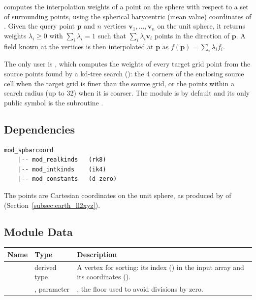  computes the interpolation weights of a point on the
sphere with respect to a set of surrounding points, using the spherical
barycentric (mean value) coordinates of \citet{langer2006}. Given the query
point $\mathbf{p}$ and $n$ vertices $\mathbf{v}_1, \ldots, \mathbf{v}_n$ on
the unit sphere, it returns weights $\lambda_i \ge 0$ with
$\sum_i \lambda_i = 1$ such that $\sum_i \lambda_i \mathbf{v}_i$ points in the
direction of $\mathbf{p}$. A field known at the vertices is then
interpolated at $\mathbf{p}$ as $f(\mathbf{p}) = \sum_i \lambda_i f_i$.

The only user is , which computes the weights of every
target grid point from the source points found by a kd-tree search
(): the 4 corners of the enclosing source cell
when the target grid is finer than the source grid, or the points within
a search radius (up to 32) when it is coarser. The module is  by default and its
only public symbol is the subroutine .

\subsection{Dependencies}

\begin{lstlisting}
mod_spbarcoord
    |-- mod_realkinds   (rk8)
    |-- mod_intkinds    (ik4)
    |-- mod_constants   (d_zero)
\end{lstlisting}

The points are Cartesian coordinates on the unit sphere, as produced by
 of  (Section~\ref{subsec:earth_ll2xyz}).

\subsection{Module Data}

\begin{longtable}{L{3.5cm} L{3.5cm} L{7cm}}
  \toprule
  \textbf{Name} & \textbf{Type} & \textbf{Description} \\
  \midrule
  \endhead
  \bottomrule
  \endfoot
   & derived type &
    A vertex for sorting: its index  () in
    the input array and its coordinates  (). \\
   & , parameter &
    , the floor used to avoid divisions by zero. \\
\end{longtable}

